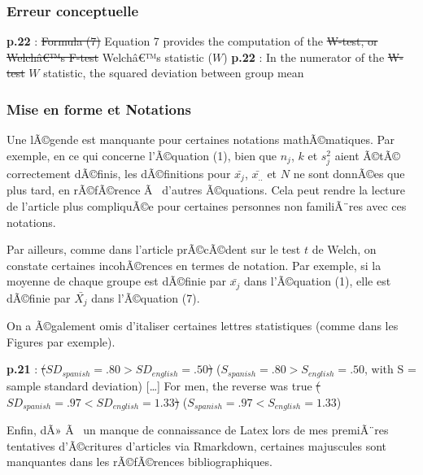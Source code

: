 \begin{appendix}
\hypertarget{erreur-conceptuelle}{%
\subsubsection{Erreur conceptuelle}\label{erreur-conceptuelle}}

\textbf{p.22} : \sout{Formula (7)} \color{blue}Equation 7 \color{black}
provides the computation of the \sout{W-test, or Welchâ€™s F-test}
\color{blue}Welchâ€™s statistic (\(W\)) \color{black} \textbf{p.22} : In
the numerator of the \sout{W-test} \color{blue}\(W\)
statistic,\color{black} the squared deviation between group mean

\hypertarget{mise-en-forme-et-notations-1}{%
\subsubsection{Mise en forme et
Notations}\label{mise-en-forme-et-notations-1}}

Une lÃ©gende est manquante pour certaines notations mathÃ©matiques. Par
exemple, en ce qui concerne l'Ã©quation (1), bien que \(n_j\), \(k\) et
\(s^2_j\) aient Ã©tÃ© correctement dÃ©finis, les dÃ©finitions pour
\(\bar{x_j}\), \(\bar{x_{..}}\) et \(N\) ne sont donnÃ©es que plus tard,
en rÃ©fÃ©rence Ã~ d'autres Ã©quations. Cela peut rendre la lecture de
l'article plus compliquÃ©e pour certaines personnes non familiÃ¨res avec
ces notations.

Par ailleurs, comme dans l'article prÃ©cÃ©dent sur le test \(t\) de
Welch, on constate certaines incohÃ©rences en termes de notation. Par
exemple, si la moyenne de chaque groupe est dÃ©finie par \(\bar{x_j}\)
dans l'Ã©quation (1), elle est dÃ©finie par \(\bar{X_j}\) dans
l'Ã©quation (7).

On a Ã©galement omis d'italiser certaines lettres statistiques (comme
dans les Figures par exemple).

\textbf{p.21} :
\sout{(\(SD_{spanish}=.80 > SD_{english}=.50\)\color{blue})}
(\(S_{spanish}=.80 > S_{english}=.50\)\color{blue}, with S = sample
standard deviation) {[}\ldots{]} \color{black}For men, the reverse was
true \sout{(\(SD_{spanish}=.97 < SD_{english}=1.33\))}
(\(S_{spanish}=.97 < S_{english}=1.33\))

Enfin, dÃ» Ã~ un manque de connaissance de Latex lors de mes premiÃ¨res
tentatives d'Ã©critures d'articles via Rmarkdown, certaines majuscules
sont manquantes dans les rÃ©fÃ©rences bibliographiques.

\hypertarget{fautes-de-frappe-et-grammaire-et-autres}{%
}
\end{appendix}
